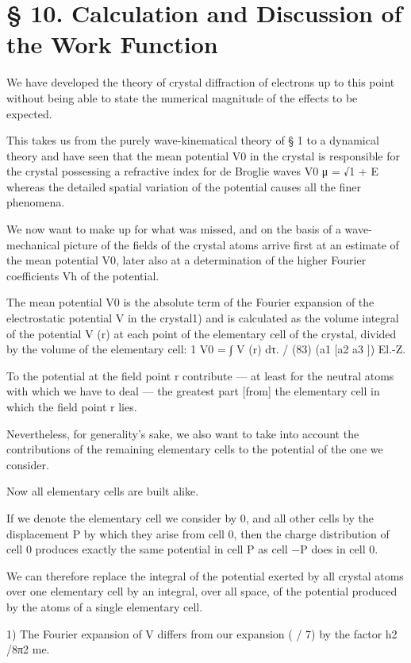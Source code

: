 \documentclass[10pt]{article}
\begin{document}
\section*{§ 10. Calculation and Discussion of the Work Function}
We have developed the theory of crystal diffraction of electrons up to this point without being able to state the numerical magnitude of the effects to be expected.\par
This takes us from the purely wave-kinematical theory of § 1 to a dynamical theory and have seen that the mean potential V0 in the crystal is responsible for the crystal possessing a refractive index for de Broglie waves V0 μ = √1 + E whereas the detailed spatial variation of the potential causes all the finer phenomena.\par
We now want to make up for what was missed, and on the basis of a wave-mechanical picture of the fields of the crystal atoms arrive first at an estimate of the mean potential V0, later also at a determination of the higher Fourier coefficients Vh of the potential.\par
The mean potential V0 is the absolute term of the Fourier expansion of the electrostatic potential V in the crystal1) and is calculated as the volume integral of the potential V (r) at each point of the elementary cell of the crystal, divided by the volume of the elementary cell: 1 V0 = ∫ V (r) dτ. / (83) (a1 [a2 a3 ]) El.-Z.\par
To the potential at the field point r contribute — at least for the neutral atoms with which we have to deal — the greatest part [from] the elementary cell in which the field point r lies.\par
Nevertheless, for generality’s sake, we also want to take into account the contributions of the remaining elementary cells to the potential of the one we consider.\par
Now all elementary cells are built alike.\par
If we denote the elementary cell we consider by 0, and all other cells by the displacement P by which they arise from cell 0, then the charge distribution of cell 0 produces exactly the same potential in cell P as cell −P does in cell 0.\par
We can therefore replace the integral of the potential exerted by all crystal atoms over one elementary cell by an integral, over all space, of the potential produced by the atoms of a single elementary cell.\par
\noindent\footnotesize 1) The Fourier expansion of V differs from our expansion ( / 7) by the factor h2 /8π2 me.\par\normalsize
\end{document}
